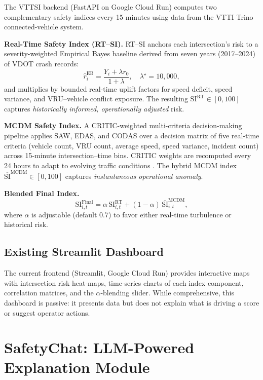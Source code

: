 \documentclass[conference]{IEEEtran}
\begin{document}
The VTTSI backend (FastAPI on Google Cloud Run) computes two complementary
safety indices every 15 minutes using data from the VTTI Trino connected-vehicle system.

\textbf{Real-Time Safety Index (RT--SI).}
RT--SI anchors each intersection's risk to a severity-weighted Empirical Bayes baseline
derived from seven years (2017--2024) of VDOT crash records:
\begin{equation}
\hat{r}^{\text{EB}}_{i} = \frac{Y_i + \lambda r_0}{1 + \lambda},
\quad \lambda^\star = 10{,}000,
\end{equation}
and multiplies by bounded real-time uplift factors for speed deficit, speed variance,
and VRU--vehicle conflict exposure.
The resulting $\mathrm{SI}^{\text{RT}} \in [0, 100]$ captures \emph{historically
informed, operationally adjusted} risk.

\textbf{MCDM Safety Index.}
A CRITIC-weighted multi-criteria decision-making pipeline applies SAW, EDAS, and CODAS
over a decision matrix of five real-time criteria (vehicle count, VRU count,
average speed, speed variance, incident count) across 15-minute intersection--time bins.
CRITIC weights are recomputed every 24 hours to adapt to evolving traffic conditions
\cite{Amraji2025CombinedSafetyIndex}.
The hybrid MCDM index $\overline{\mathrm{SI}}^{\mathrm{MCDM}} \in [0, 100]$ captures
\emph{instantaneous operational anomaly}.

\textbf{Blended Final Index.}
\begin{equation}
\mathrm{SI}^{\text{Final}}_{i,t} =
\alpha\,\mathrm{SI}^{\text{RT}}_{i,t} +
(1-\alpha)\,\overline{\mathrm{SI}}^{\text{MCDM}}_{i,t},
\end{equation}
where $\alpha$ is adjustable (default 0.7) to favor either real-time turbulence or
historical risk.

\subsection{Existing Streamlit Dashboard}

The current frontend (Streamlit, Google Cloud Run) provides interactive maps with
intersection risk heat-maps, time-series charts of each index component, correlation
matrices, and the $\alpha$-blending slider. While comprehensive, this dashboard is
passive: it presents data but does not explain what is driving a score or suggest
operator actions.

\section{SafetyChat: LLM-Powered Explanation Module}
\label{sec:safetychat}
\end{document}

